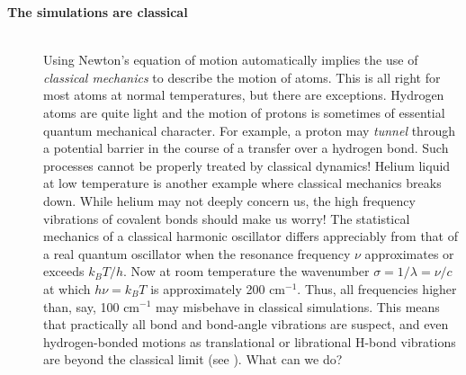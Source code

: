 \begin{description}
\item[{\bf The simulations are classical}]\mbox{}\\
Using Newton's equation of motion automatically implies the use of
{\em classical mechanics} to describe the motion of atoms. This is
all right for most atoms at normal temperatures, but there are
exceptions. Hydrogen atoms are quite light and the motion of protons
is sometimes of essential quantum mechanical character. For example, a
proton may {\em tunnel} through a potential barrier in the course of a
transfer over a hydrogen bond. Such processes cannot be properly
treated by classical dynamics! Helium liquid at low temperature is
another example where classical mechanics breaks down. While helium
may not deeply concern us, the high frequency vibrations of covalent
bonds should make us worry! The statistical mechanics of a classical
harmonic oscillator differs appreciably from that of a real quantum
oscillator when the resonance frequency $\nu$ approximates or exceeds
$k_BT/h$. Now at room temperature the wavenumber $\sigma = 1/\lambda =
\nu/c$ at which $h
\nu = k_BT$ is approximately 200 cm$^{-1}$. Thus, all frequencies
higher than, say, 100 cm$^{-1}$ may misbehave in
classical simulations. This means that practically all bond and
bond-angle vibrations are suspect, and even hydrogen-bonded motions as
translational or librational H-bond vibrations are beyond the
classical limit (see ). What can we do?



\end{description}
